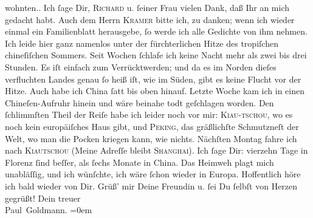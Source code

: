 \begin{ledgroupsized}[t]{13cm}
{{{                  wohnten.}}}\label{K_L02853-1h}. Ich ſage Dir, \textsc{Richard} u. ſeiner Frau vielen
               Dank, daß Ihr an mich gedacht habt. Auch dem Herrn \textsc{Kramer} bitte ich, zu danken; wenn ich wieder einmal ein Familienblatt herausgebe, ſo werde ich alle
               Gedichte von ihm nehmen.\pend
           \pstart
           Ich leide hier ganz namenlos unter der fürchterlichen Hitze des tropiſchen chineſiſchen Sommers. Seit
               Wochen ſchlafe {\pb}ich keine Nacht mehr als zwei bis
               drei Stunden. Es iſt einfach zum Verrücktwerden; und da es im Norden dieſes
               verfluchten Landes genau ſo
               heiß iſt, wie im Süden, gibt es keine Flucht vor der Hitze. Auch habe ich China ſatt bis oben hinauf. Letzte Woche kam ich
               in einen Chineſen-Aufruhr
               hinein und wäre beinahe todt geſchlagen worden. Den ſchlimmſten Theil der Reiſe habe
               ich leider noch vor mir: \textsc{Kiau-tschou}, wo es noch kein europäiſches Haus gibt, und \textsc{Peking}, das gräßlichſte Schmutzneſt der {\pb}Welt, wo man
               die Pocken kriegen kann, wie nichts. Nächſten Montag
               fahre ich nach \textsc{Kiautschou} (Meine Adreſſe bleibt \textsc{Shanghai}). Ich ſage Dir: vierzehn Tage in Florenz
               ſind beſſer, als ſechs Monate in China. Das
               Heimweh plagt mich unabläſſig, und ich wünſchte, ich wäre ſchon wieder in Europa.\pend
           \pstart
           Hoffentlich höre ich bald wieder von Dir. Grüß’ mir Deine Freundin u. ſei Du ſelbſt von Herzen
               gegrüßt!\pend
           \pstart
           Dein treuer {\\[\baselineskip]}\spacefill\mbox{Paul Goldmann.}\pend
           \leftskip=0em{}
         
         \endnumbering{}\end{ledgroupsized}  \newcommand{\dateiname}{L02853}\newcommand{\titel}{Paul Goldmann an Arthur Schnitzler, 21. 7. [1898]}\newcommand{\editorInnen}{Martin Anton Müller und Laura Untner}
      